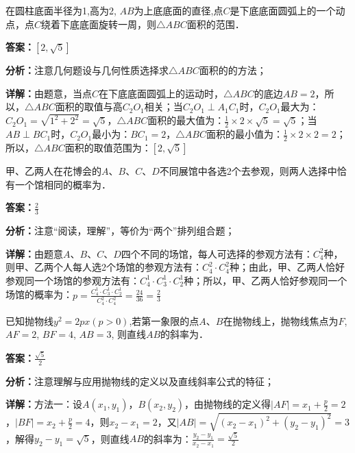 \begin{question}[points=5]
在圆柱底面半径为1,高为2, $AB$为上底底面的直径,点$C$是下底底面圆弧上的一个动点，点$C$绕着下底底面旋转一周，则$\triangle ABC$面积的范围．
\fillin[{$[2,\sqrt{5}]$}]
\begin{solution}
\textbf{答案：}$[2,\sqrt{5}]$

\textbf{分析：}注意几何题设与几何性质选择求$\triangle ABC$面积的的方法；

\textbf{详解：}由题意，当点$C$在下底底面圆弧上的运动时，$\triangle ABC$的底边$AB=2$，所以，$\triangle ABC$面积的取值与高$C_2O_1$相关；当$C_2O_1\perp A_1C_1$时，$C_2O_1$最大为：$C_2O_1=\sqrt{1^2+2^2}=\sqrt{5}$，$\triangle ABC$面积的最大值为：$\frac{1}{2}\times2\times\sqrt{5}=\sqrt{5}$；当$AB\perp BC_1$时，$C_2O_1$最小为：$BC_1=2$，$\triangle ABC$面积的最小值为：$\frac{1}{2}\times2\times2=2$；所以，$\triangle ABC$面积的取值范围为：$[2,\sqrt{5}]$
\end{solution}
\end{question}

\begin{question}[points=5]
甲、乙两人在花博会的$A$、$B$、$C$、$D$不同展馆中各选2个去参观，则两人选择中恰有一个馆相同的概率为．
\fillin[{$\frac{2}{3}$}]
\begin{solution}
\textbf{答案：}$\frac{2}{3}$

\textbf{分析：}注意“阅读，理解”，等价为“两个”排列组合题；

\textbf{详解：}由题意$A$、$B$、$C$、$D$四个不同的场馆，每人可选择的参观方法有：$C_4^2$种，则甲、乙两个人每人选2个场馆的参观方法有：$C_4^2\cdot C_4^2$种；由此，甲、乙两人恰好参观同一个场馆的参观方法有：$C_4^1\cdot C_3^1\cdot C_2^1$种；所以，甲、乙两人恰好参观同一个场馆的概率为：$p=\frac{C_4^1\cdot C_3^1\cdot C_2^1}{C_4^2\cdot C_4^2}=\frac{24}{36}=\frac{2}{3}$
\end{solution}
\end{question}

\begin{question}[points=5]
已知抛物线$y^2=2px(p>0)$,若第一象限的点$A$、$B$在抛物线上，抛物线焦点为$F$, $AF=2$, $BF=4$, $AB=3$, 则直线$AB$的斜率为．
\begin{solution}
\textbf{答案：}$\frac{\sqrt{5}}{2}$

\textbf{分析：}注意理解与应用抛物线的定义以及直线斜率公式的特征；

\textbf{详解：}方法一：设$A(x_1,y_1)$，$B(x_2,y_2)$，由抛物线的定义得$|AF|=x_1+\frac{p}{2}=2$，$|BF|=x_2+\frac{p}{2}=4$，则$x_2-x_1=2$，又$|AB|=\sqrt{(x_2-x_1)^2+(y_2-y_1)^2}=3$，解得$y_2-y_1=\sqrt{5}$，则直线$AB$的斜率为：$\frac{y_2-y_1}{x_2-x_1}=\frac{\sqrt{5}}{2}$
\end{solution}
\end{question}

